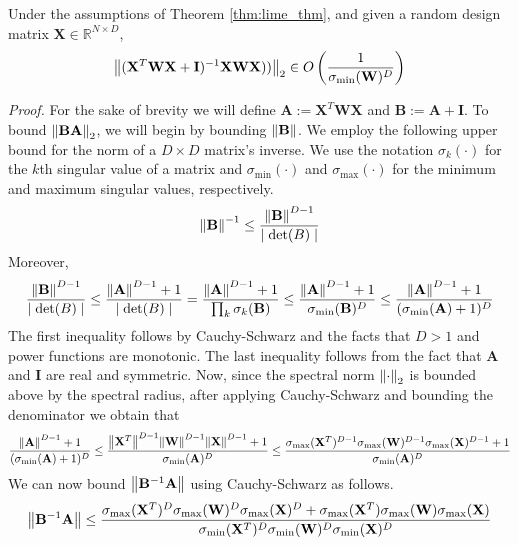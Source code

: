 \documentclass[mnsc,blindrev]{informs3}
\newcommand{\bA}{\mathbf{A}}
\newcommand{\bB}{\mathbf{B}}
\newcommand{\bX}{\mathbf{X}}
\newcommand{\bI}{\mathbf{I}}
\newcommand{\bW}{\mathbf{W}}
\begin{document}
    \begin{lemma}
        \label{norm_bd}
        Under the assumptions of  Theorem \ref{thm:lime_thm}, and given a random  design matrix $\bX \in \mathbb{R}^{N\times D}$,
        \[\norm{(\bX^T \bW \bX + \bI)^{-1}\bX \bW \bX))}_2 \in O\left(\frac{1}{\sigma_{\min}(\bW)^D}\right) \]
    \end{lemma}
    
  \noindent \emph{Proof.} For the sake of brevity we will define $\bA := \bX^T \bW \bX$ and $\bB := \bA + \bI$. To bound $\norm{\bB \bA}_2$, we will begin by bounding $\norm{\bB}$. We employ the following upper bound for the norm of a $D \times D$ matrix's inverse. We use the notation $\sigma_k(\cdot)$ for the $k$th singular value of a matrix and $\sigma_{\min}(\cdot)$ and $\sigma_{\max}(\cdot)$ for the minimum and maximum singular values, respectively. 
  \begin{equation*}
      \norm{\bB}^{-1} \leq \frac{\norm{\bB}^{D-1}}{\mid \mathrm{det}(B)\mid}
  \end{equation*}
  Moreover,
  \begin{gather*}
      \frac{\norm{\bB}^{D-1}}{\mid \mathrm{det}(B)\mid} \leq \frac{\norm{\bA}^{D-1} + 1}{\mid \mathrm{det}(B)\mid} 
      =  \frac{\norm{\bA}^{D-1} + 1}{\prod_k \sigma_k(\bB)} 
      \leq \frac{\norm{\bA}^{D-1} + 1}{\sigma_{\min}(\bB)^D} 
      \leq  \frac{\norm{\bA}^{D-1} + 1}{(\sigma_{\min}(\bA) + 1)^D} 
  \end{gather*}
    The first inequality follows by Cauchy-Schwarz and the facts that  $D>1$ and power functions are monotonic. The last inequality follows from the fact that $\bA$ and $\bI$ are real and symmetric.
    Now, since the spectral norm $\norm{\cdot}_2$ is bounded above by the spectral radius, after applying Cauchy-Schwarz and bounding the denominator we obtain that
    \begin{gather*}
        \frac{\norm{\bA}^{D-1} + 1}{(\sigma_{\min}(\bA) + 1)^D} \leq \frac{\norm{\bX^T}^{D-1}\norm{\bW}^{D-1}\norm{\bX}^{D-1} + 1}{\sigma_{\min}(\bA)^D} \leq \frac{\sigma_{\max}(\bX^T)^{D-1}\sigma_{\max}(\bW)^{D-1}\sigma_{\max}(\bX)^{D-1} + 1}{\sigma_{\min}(\bA)^D}
    \end{gather*}
    We can now bound $\norm{\bB^{-1}\bA}$ using Cauchy-Schwarz as follows.
    \begin{equation*}
        \norm{\bB^{-1}\bA} \leq \frac{\sigma_{\max}(\bX^T)^{D}\sigma_{\max}(\bW)^{D}\sigma_{\max}(\bX)^{D} + \sigma_{\max}(\bX^T)\sigma_{\max}(\bW)\sigma_{\max}(\bX)}{\sigma_{\min}(\bX^T)^{D}\sigma_{\min}(\bW)^{D}\sigma_{\min}(\bX)^{D}}
    \end{equation*}
\end{document}
